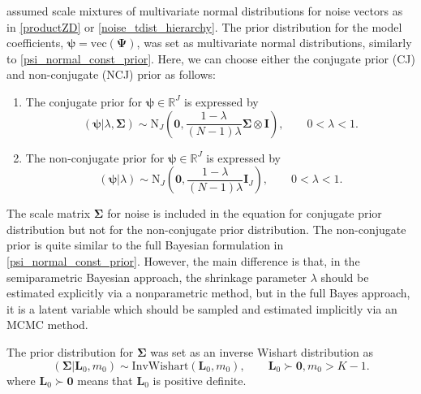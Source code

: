 \documentclass[
]{jss}
\begin{document}
\citet{LeeChoiKim2016} assumed scale mixtures of multivariate normal
distributions for noise vectors as in \eqref{productZD} or
\eqref{noise_tdist_hierarchy}. The prior distribution for the model
coefficients, \(\boldsymbol\psi = \text{vec}(\mathbf{\Psi})\), was set
as multivariate normal distributions, similarly to
\eqref{psi_normal_const_prior}. Here, we can choose either the conjugate
prior (CJ) and non-conjugate (NCJ) prior as follows:

\begin{enumerate}
\def\labelenumi{(\roman{enumi})}
\item
  The conjugate prior for \(\boldsymbol\psi \in\mathbb{R}^J\) is
  expressed by \begin{equation}
      (\boldsymbol\psi | \lambda, \mathbf{\Sigma})    \sim \text{N}_{J} \left(\mathbf{0}, \frac{1-\lambda}{(N - 1) \lambda} \mathbf{\Sigma} \otimes \mathbf{I} \right),
      \qquad
      0<\lambda < 1.
      \end{equation}
\item
  The non-conjugate prior for \(\boldsymbol\psi \in\mathbb{R}^J\) is
  expressed by \begin{equation}
    (\boldsymbol\psi | \lambda)    \sim \text{N}_{J} \left(\mathbf{0}, \frac{1-\lambda}{(N - 1) \lambda} \mathbf{I}_J \right),
    \qquad
    0<\lambda < 1.
    \end{equation}
\end{enumerate}

The scale matrix \(\mathbf{\Sigma}\) for noise is included in the
equation for conjugate prior distribution but not for the non-conjugate
prior distribution. The non-conjugate prior is quite similar to the full
Bayesian formulation in \eqref{psi_normal_const_prior}. However, the
main difference is that, in the semiparametric Bayesian approach, the
shrinkage parameter \(\lambda\) should be estimated explicitly via a
nonparametric method, but in the full Bayes approach, it is a latent
variable which should be sampled and estimated implicitly via an MCMC
method.

The prior distribution for \(\mathbf\Sigma\) was set as an inverse
Wishart distribution as \begin{equation}
    (\mathbf{\Sigma} | \mathbf{L}_0, m_0) \sim
    \text{InvWishart}( \mathbf{L}_0, m_0),
    \qquad
     \mathbf{L}_0 \succ \mathbf{0}, m_0 > K - 1.
    \end{equation} where \(\mathbf{L}_0 \succ \mathbf{0}\) means that
\(\mathbf{L}_0\) is positive definite.
\end{document}
